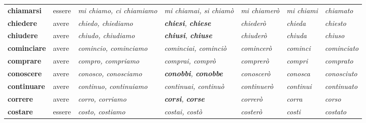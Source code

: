 \documentclass[11pt,a4paper,twoside,openright]{book}
\newcommand{\irr}[1]{{\color{exccol}\bfseries #1}}
\begin{document}
{\begin{xltabular}{\linewidth}{@{}>{\raggedright\arraybackslash}p{2.7cm} l L L l >{\raggedright\arraybackslash}p{1.9cm} l@{}}
\textbf{chiamarsi} & essere & \textit{mi chiamo, ci chiamiamo} & \textit{mi chiamai, si chiamò} & \textit{mi chiamerò} & \textit{mi chiami} & \textit{chiamato} \\
\textbf{chiedere} & avere & \textit{chiedo, chiediamo} & \textit{\irr{chiesi}, \irr{chiese}} & \textit{chiederò} & \textit{chieda} & \textit{chiesto} \\
\textbf{chiudere} & avere & \textit{chiudo, chiudiamo} & \textit{\irr{chiusi}, \irr{chiuse}} & \textit{chiuderò} & \textit{chiuda} & \textit{chiuso} \\
\textbf{cominciare} & avere & \textit{comincio, cominciamo} & \textit{cominciai, cominciò} & \textit{comincerò} & \textit{cominci} & \textit{cominciato} \\
\textbf{comprare} & avere & \textit{compro, compriamo} & \textit{comprai, comprò} & \textit{comprerò} & \textit{compri} & \textit{comprato} \\
\textbf{conoscere} & avere & \textit{conosco, conosciamo} & \textit{\irr{conobbi}, \irr{conobbe}} & \textit{conoscerò} & \textit{conosca} & \textit{conosciuto} \\
\textbf{continuare} & avere & \textit{continuo, continuiamo} & \textit{continuai, continuò} & \textit{continuerò} & \textit{continui} & \textit{continuato} \\
\textbf{correre} & avere & \textit{corro, corriamo} & \textit{\irr{corsi}, \irr{corse}} & \textit{correrò} & \textit{corra} & \textit{corso} \\
\textbf{costare} & essere & \textit{costo, costiamo} & \textit{costai, costò} & \textit{costerò} & \textit{costi} & \textit{costato} \\

\end{xltabular}}
\end{document}

